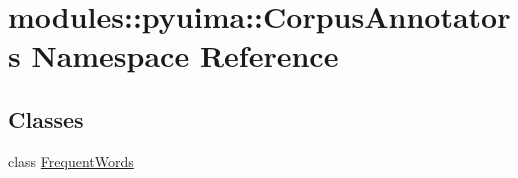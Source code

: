 \hypertarget{namespacemodules_1_1pyuima_1_1CorpusAnnotators}{\section{modules\-:\-:pyuima\-:\-:\-Corpus\-Annotators \-Namespace \-Reference}
\label{namespacemodules_1_1pyuima_1_1CorpusAnnotators}
}
\subsection*{\-Classes}
\begin{DoxyCompactItemize}
\item 
class \hyperlink{classmodules_1_1pyuima_1_1CorpusAnnotators_1_1FrequentWords}{\-Frequent\-Words}
\end{DoxyCompactItemize}
